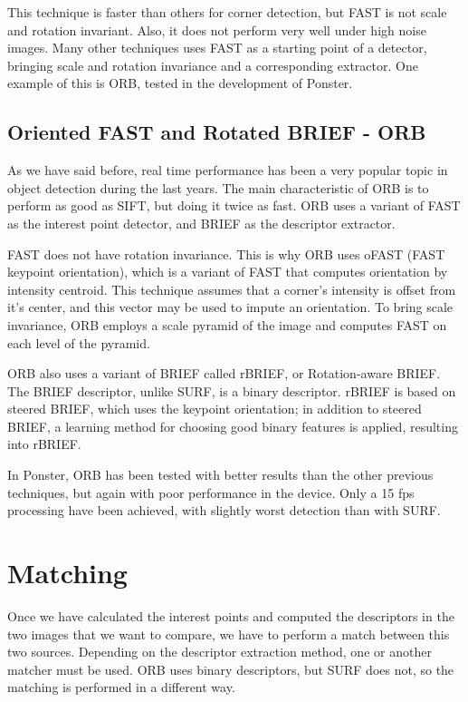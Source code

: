 This technique is faster than others for corner detection, but FAST is not
scale and rotation invariant. Also, it does not perform very well under high
noise images. Many other techniques uses FAST as a starting point of a
detector, bringing scale and rotation invariance and a corresponding
extractor. One example of this is ORB, tested in the development of Ponster.

\subsection{Oriented FAST and Rotated BRIEF - ORB}
As we have said before, real time performance has been a very popular topic in
object detection during the last years. The main characteristic of ORB is to
perform as good as SIFT, but doing it twice as fast. ORB uses a variant of FAST
as the interest point detector, and BRIEF as the descriptor extractor. 

FAST does not have rotation invariance. This is why ORB uses oFAST (FAST
keypoint orientation), which is a variant of FAST that computes orientation by
intensity centroid. This technique assumes that a corner's intensity is offset
from it's center, and this vector may be used to impute an
orientation\cite{6126544}. To bring scale invariance, ORB employs a scale pyramid of the image
and computes FAST on each level of the pyramid.

ORB also uses a variant of BRIEF called rBRIEF, or Rotation-aware BRIEF. The
BRIEF descriptor, unlike SURF, is a binary descriptor. rBRIEF is based on
steered BRIEF, which uses the keypoint orientation; in addition to steered
BRIEF, a learning method for choosing good binary features is applied,
resulting into rBRIEF.

In Ponster, ORB has been tested with better results than the other previous
techniques, but again with poor performance in the device. Only a 15 fps
processing have been achieved, with slightly worst detection than with SURF.

\section{Matching}
Once we have calculated the interest points and computed the descriptors in the
two images that we want to compare, we have to perform a match between this two
sources. Depending on the descriptor extraction method, one or another matcher
must be used. ORB uses binary descriptors, but SURF does not, so the matching
is performed in a different way.

